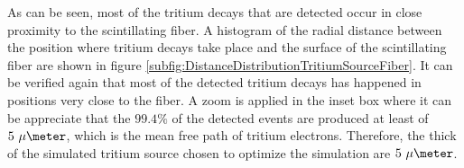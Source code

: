 As can be seen, most of the tritium decays that are detected occur in close proximity to the scintillating fiber. A histogram of the radial distance between the position where tritium decays take place and the surface of the scintillating fiber are shown in figure \ref{subfig:DistanceDistributionTritiumSourceFiber}. It can be verified again that most of the detected tritium decays has happened in positions very close to the fiber. A zoom is applied in the inset box where it can be appreciate that the $99.4\%$ of the detected events are produced at least of $5~\mu\meter$, which is the mean free path of tritium electrons. Therefore, the thick of the simulated tritium source chosen to optimize the simulation are $5~\mu\meter$. 


